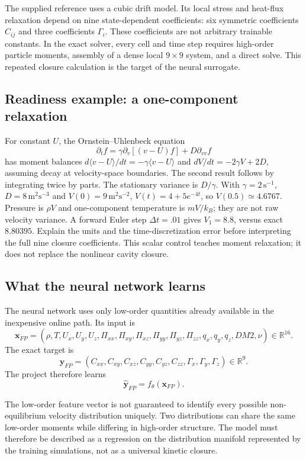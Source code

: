 \documentclass[11pt]{article}
\begin{document}
The supplied reference uses a cubic drift model. Its local stress and heat-flux relaxation depend on nine state-dependent coefficients: six symmetric coefficients $C_{ij}$ and three coefficients $\Gamma_i$. These coefficients are not arbitrary trainable constants. In the exact solver, every cell and time step requires high-order particle moments, assembly of a dense local $9\times9$ system, and a direct solve. This repeated closure calculation is the target of the neural surrogate.

\subsection{Readiness example: a one-component relaxation}
For constant $U$, the Ornstein--Uhlenbeck equation
\[
\partial_t f=\gamma\partial_v[(v-U)f]+D\partial_{vv}f
\]
has moment balances $d\langle v-U\rangle/dt=-\gamma\langle v-U\rangle$
and $dV/dt=-2\gamma V+2D$, assuming decay at velocity-space boundaries.
The second result follows by integrating twice by parts. The stationary
variance is $D/\gamma$. With $\gamma=2\,\mathrm{s}^{-1}$,
$D=8\,\mathrm{m}^2\mathrm{s}^{-3}$ and $V(0)=9\,\mathrm{m}^2\mathrm{s}^{-2}$,
$V(t)=4+5e^{-4t}$, so $V(0.5)\simeq4.6767$.
Pressure is $\rho V$ and one-component temperature is $mV/k_B$; they are not
raw velocity variance. A forward Euler step $\Delta t=.01$ gives $V_1=8.8$,
versus exact $8.80395$. Explain the units and the time-discretization error
before interpreting the full nine closure coefficients. This scalar control
teaches moment relaxation; it does not replace the nonlinear cavity closure.


\subsection{What the neural network learns}
The neural network uses only low-order quantities already available in the inexpensive online path. Its input is
\[
\mathbf x_{FP}=
(\rho,T,U_x,U_y,U_z,
\Pi_{xx},\Pi_{xy},\Pi_{xz},\Pi_{yy},\Pi_{yz},\Pi_{zz},
q_x,q_y,q_z,DM2,\nu)\in\mathbb R^{16}.
\]
The exact target is
\[
\mathbf y_{FP}=
(C_{xx},C_{xy},C_{xz},C_{yy},C_{yz},C_{zz},
\Gamma_x,\Gamma_y,\Gamma_z)\in\mathbb R^{9}.
\]
The project therefore learns
\[
\widehat{\mathbf y}_{FP}=f_{\theta}(\mathbf x_{FP}).
\]

The low-order feature vector is not guaranteed to identify every possible non-equilibrium velocity distribution uniquely. Two distributions can share the same low-order moments while differing in high-order structure. The model must therefore be described as a regression on the distribution manifold represented by the training simulations, not as a universal kinetic closure.
\end{document}
